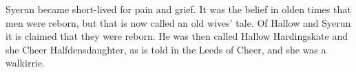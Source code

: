\bpb Syerun became short-lived for pain and grief.  It was the belief in olden times that men were reborn, but that is now called an old wives’ tale.  Of Hallow and Syerun it is claimed that they were reborn.  He was then called Hallow Hardingskate and she Cheer Halfdensdaughter, as is told in the Leeds of Cheer, and she was a walkirrie.\epb\epg

\sectionline
